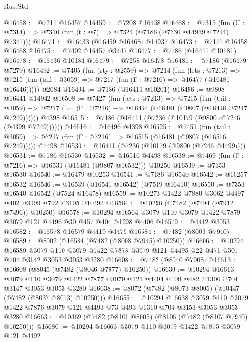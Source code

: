 \begin{lexlean}{RustStd}
\begin{coremodule}
@16458 := @7211 @16457
@16459 := @7208 @16458
@16468 := @7315
    (fun (U : @7314) => @7316 (fun (t : @7) => @7324 (@7186 (@7330 @14939 @7204) @7341)))
@16471 := @16433 (@16459 @16468) @14937
@16473 := @7171 @16458 @16468
@16475 := @7402 @16457 @3447
@16477 := @7186 (@16411 @10181)
@16478 := @16436 @10184
@16479 := @7258 @16478
@16481 := @7186 (@16479 @7279)
@16492 := @7405
    (fun (rty : @2559) =>
    @7214
      (fun (lets : @7213) =>
      @7215 (fun (tail : @3059) => @7217 (fun (Γ : @7216) => @16477 (@16481 @16446)))))
    @2684
@16494 := @7186 (@16411 @10201)
@16496 := @9808 @16441 @14942
@16508 := @7427
    (fun (lets : @7213) =>
    @7215
      (fun (tail : @3059) =>
      @7217 (fun (Γ : @7216) => @16494 (@16481 (@9807 (@16496 @7247 @7249))))))
    @4398
@16515 := @7186 (@16411 (@7236 (@10179 (@9800 (@7246 (@4399 @7249))))))
@16516 := @16496 @4398
@16525 := @7451
    (fun (tail : @3059) => @7217 (fun (Γ : @7216) => @16515 (@16481 (@9807 (@16516 @7249)))))
    @4498
@16530 := @16411 (@7236 (@10179 (@9800 (@7246 @4499))))
@16531 := @7186 @16530
@16532 := @16516 @4498
@16538 := @7469 (fun (Γ : @7216) => @16531 (@16481 (@9807 @16532))) @10250
@16539 := @7353 @16530
@16540 := @16479 @10253
@16541 := @7186 @16540
@16542 := @10257 @16532
@16546 := @16539 (@16541 @16542) (@7519 @16410)
@16550 := @7353 @16540 @16542 (@7524 @16478)
@16559 := @10273 @1422 @7880 @3062 @4497 @402 @3099 @792 @3105 @10292
@16564 := @10296 (@7482 (@7494 (@7912 @7496)) @10250)
@16578 := @10294 @16564 @3079 @110 @3079 @1422 @7879 @3079 @121 @4496 @30 @457 @404 @1298 @4406
@16579 := @4412 @3053
@16582 := @16578 @16579 @4419 @4479
@16584 := @7482 (@8003 @7940)
@16589 := @8002 (@16584 (@7482 (@8008 @7945) @10250))
@16606 := @10294
    @16589
    @3079
    @110
    @3079
    @1422
    @7878
    @3079
    @121
    @4495
    @22
    @471
    @501
    @704
    @3142
    @3053
    @3053
    @3280
@16608 := @7482 (@8040 @7908)
@16613 := @16608 (@8045 (@7482 (@8046 @7977) @10250))
@16630 := @10294
    @16613
    @3079
    @110
    @3079
    @1422
    @7877
    @3079
    @121
    @4494
    @109
    @482
    @1306
    @704
    @3147
    @3053
    @3053
    @3280
@16638 := @8072 (@7482 (@8073 @8005) (@10447 (@7482 (@8037 @8013) @10250)))
@16655 := @10294
    @16638
    @3079
    @110
    @3079
    @1422
    @7876
    @3079
    @121
    @4493
    @73
    @493
    @1310
    @704
    @3153
    @3053
    @3053
    @3280
@16663 := @10469 (@7482 (@8101 @8005) (@8106 (@7482 (@8107 @7940) @10250)))
@16680 := @10294
    @16663
    @3079
    @110
    @3079
    @1422
    @7875
    @3079
    @121
    @4492

\end{coremodule}
\end{lexlean}

